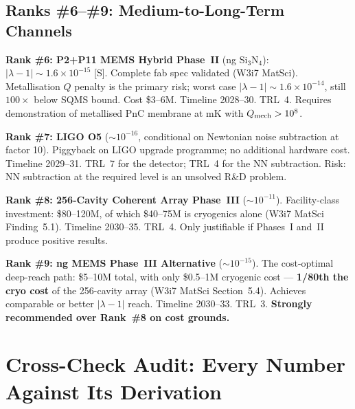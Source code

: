 \documentclass[11pt]{article}
\newcommand{\lam}{\lambda}
\newcommand{\ee}[1]{\times 10^{#1}}
\newcommand{\Qmech}{Q_{\rm mech}}
\newcommand{\lbone}{|\lam - 1|}
\theoremstyle{definition}
\theoremstyle{remark}
\begin{document}
\subsection{Ranks \#6--\#9: Medium-to-Long-Term Channels}
\label{ssec:ranks6_9}

\textbf{Rank \#6: P2+P11 MEMS Hybrid Phase~II} (ng Si$_3$N$_4$):
$\lbone \sim 1.6\ee{-15}$ [S]. Complete fab spec validated (W3i7 MatSci).
Metallisation $Q$ penalty is the primary risk; worst case
$\lbone \sim 1.6\ee{-14}$, still $100\times$ below SQMS bound. Cost
\$3--6M. Timeline 2028--30. TRL~4. Requires demonstration of metallised
PnC membrane at mK with $\Qmech > 10^8$.

\textbf{Rank \#7: LIGO O5} ($\sim 10^{-16}$, conditional on Newtonian
noise subtraction at factor 10). Piggyback on LIGO upgrade programme;
no additional hardware cost. Timeline 2029--31. TRL~7 for the
detector; TRL~4 for the NN subtraction. Risk: NN subtraction at the
required level is an unsolved R\&D problem.

\textbf{Rank \#8: 256-Cavity Coherent Array Phase~III}
($\sim 10^{-11}$). Facility-class investment: \$80--120M, of which
\$40--75M is cryogenics alone (W3i7 MatSci Finding~5.1). Timeline
2030--35. TRL~4. Only justifiable if Phases~I and~II produce positive
results.

\textbf{Rank \#9: ng MEMS Phase~III Alternative}
($\sim 10^{-15}$). The cost-optimal deep-reach path: \$5--10M total,
with only \$0.5--1M cryogenic cost --- \textbf{1/80th the cryo cost}
of the 256-cavity array (W3i7 MatSci Section~5.4). Achieves
comparable or better $\lbone$ reach. Timeline 2030--33. TRL~3.
\textbf{Strongly recommended over Rank~\#8 on cost grounds.}


\section{Cross-Check Audit: Every Number Against Its Derivation}
\label{sec:crosscheck}
\end{document}
